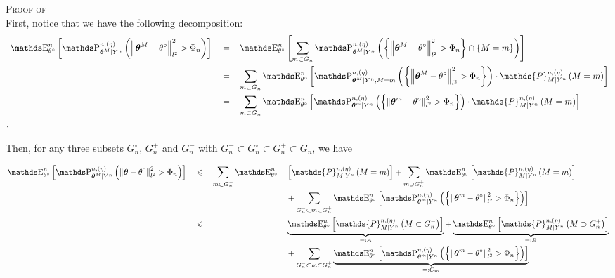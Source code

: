 \begin{pro}{\textsc{Proof of } \\}\label{PRO_BAYES_STRATEGIES_EXPO}
First, notice that we have the following decomposition:
\begin{alignat*}{3}
& \E_{\theta^{\circ}}^{n}\left[\P^{n, (\eta)}_{\boldsymbol{\theta}^{M} \vert Y^{n}}\left(\left\Vert  \boldsymbol{\theta}^{M} - \theta^{\circ}\right\Vert_{l^{2}}^{2} > \Phi_{n} \right)\right] && = && \E_{\theta^{\circ}}^{n}\left[\sum\limits_{m \subset G_{n}}\P^{n, (\eta)}_{\boldsymbol{\theta}^{M} \vert Y^{n}}\left(\left\{\left\Vert  \boldsymbol{\theta}^{M} - \theta^{\circ}\right\Vert_{l^{2}}^{2} > \Phi_{n}\right\} \cap \left\{ M = m \right\} \right)\right]\\
& && = && \sum\limits_{m \subset G_{n}}\E_{\theta^{\circ}}^{n}\left[\P^{n, (\eta)}_{\boldsymbol{\theta}^{M} \vert Y^{n}, M = m}\left(\left\{\left\Vert  \boldsymbol{\theta}^{M} - \theta^{\circ}\right\Vert_{l^{2}}^{2} > \Phi_{n}\right\}\right) \cdot \mathds{P}_{M \vert Y^{n}}^{n, (\eta)}\left(M = m\right)\right]\\
& && = && \sum\limits_{m \subset G_{n}}\E_{\theta^{\circ}}^{n}\left[\P^{n, (\eta)}_{\boldsymbol{\theta}^{m} \vert Y^{n}}\left(\left\{\left\Vert  \boldsymbol{\theta}^{m} - \theta^{\circ}\right\Vert_{l^{2}}^{2} > \Phi_{n}\right\}\right) \cdot \mathds{P}_{M \vert Y^{n}}^{n, (\eta)}\left(M = m\right)\right]\\.
\end{alignat*}

Then, for any three subsets $G^{\circ}_{n}$, $G^{+}_{n}$ and $G^{-}_{n}$ with $G^{-}_{n} \subset G^{\circ}_{n} \subset G^{+}_{n} \subset G_{n}$, we have

\begin{alignat*}{4}
& \E_{\theta^{\circ}}^{n}\left[\P^{n, (\eta)}_{\boldsymbol{\theta}^{M} \vert Y^{n}}\left(\left\Vert  \boldsymbol{\theta} - \theta^{\circ}\right\Vert_{l^{2}}^{2} > \Phi_{n} \right)\right] && \leq && \sum\limits_{m \subset G^{-}_{n}}\E_{\theta^{\circ}}^{n} &&\left[\mathds{P}_{M \vert Y^{n}}^{n, (\eta)}\left(M = m\right)\right] + \sum\limits_{m \supset G^{+}_{n}}\E_{\theta^{\circ}}^{n}\left[\mathds{P}_{M \vert Y^{n}}^{n, (\eta)}\left(M = m\right)\right]\\
& && && && +  \sum\limits_{G^{-}_{n} \subset m \subset G^{+}_{n}}\E_{\theta^{\circ}}^{n}\left[\P^{n, (\eta)}_{\boldsymbol{\theta}^{m} \vert Y^{n}}\left(\left\{\left\Vert  \boldsymbol{\theta}^{m} - \theta^{\circ}\right\Vert_{l^{2}}^{2} > \Phi_{n}\right\}\right)\right]\\
& && \leq && &&\underbrace{\E_{\theta^{\circ}}^{n}\left[\mathds{P}_{M \vert Y^{n}}^{n, (\eta)}\left(M \subset G^{-}_{n}\right)\right]}_{=: A} + \underbrace{\E_{\theta^{\circ}}^{n}\left[\mathds{P}_{M \vert Y^{n}}^{n, (\eta)}\left(M \supset G^{+}_{n}\right)\right]}_{=: B}\\
& && && && +  \sum\limits_{G^{-}_{n} \subset m \subset G^{+}_{n}}\underbrace{\E_{\theta^{\circ}}^{n}\left[\P^{n, (\eta)}_{\boldsymbol{\theta}^{m} \vert Y^{n}}\left(\left\{\left\Vert  \boldsymbol{\theta}^{m} - \theta^{\circ}\right\Vert_{l^{2}}^{2} > \Phi_{n}\right\}\right)\right]}_{=:C_{m}}
\end{alignat*}


\end{pro}
